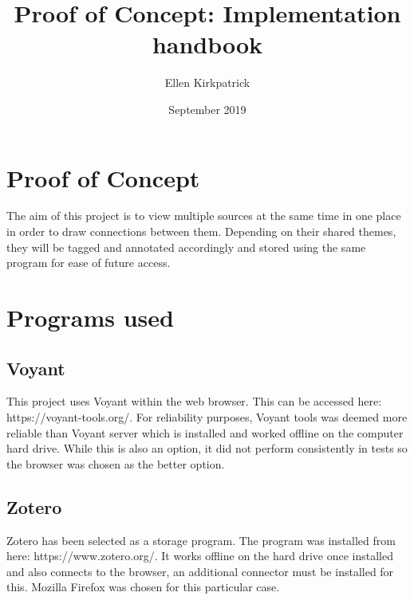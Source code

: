 \documentclass{article}
\title{Proof of Concept: Implementation handbook}
\author{Ellen Kirkpatrick }
\date{September 2019}
\begin{document}
\maketitle

\section{Proof of Concept}
The aim of this project is to view multiple sources at the same time in one place in order to draw connections between them. Depending on their shared themes, they will be tagged and annotated accordingly and stored using the same program for ease of future access.

\section{Programs used}
\subsection{Voyant}
This project uses Voyant within the web browser. This can be accessed here: https://voyant-tools.org/. For reliability purposes, Voyant tools was deemed more reliable than Voyant server which is installed and worked offline on the computer hard drive. While this is also an option, it did not perform consistently in tests so the browser was chosen as the better option.
\subsection{Zotero}
Zotero has been selected as a storage program. The program was installed from here: https://www.zotero.org/. It works offline on the hard drive once installed and also connects to the browser, an additional connector must be installed for this. Mozilla Firefox was chosen for this particular case. 
\end{document}
